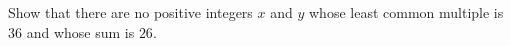 Show that there are no positive integers $x$ and $y$ whose least common multiple is $36$ and whose sum is $26$.
